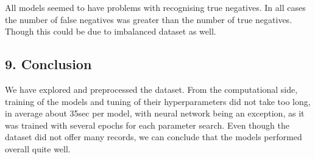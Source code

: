 \documentclass[]{article}
\begin{document}
All models seemed to have problems with recognising true negatives. In
all cases the number of false negatives was greater than the number of
true negatives. Though this could be due to imbalanced dataset as well.

\hypertarget{conclusion}{%
\subsection{9. Conclusion}\label{conclusion}}

We have explored and preprocessed the dataset. From the computational
side, training of the models and tuning of their hyperparameters did not
take too long, in average about 35sec per model, with neural network
being an exception, as it was trained with several epochs for each
parameter search. Even though the dataset did not offer many records, we
can conclude that the models performed overall quite well.
\end{document}
